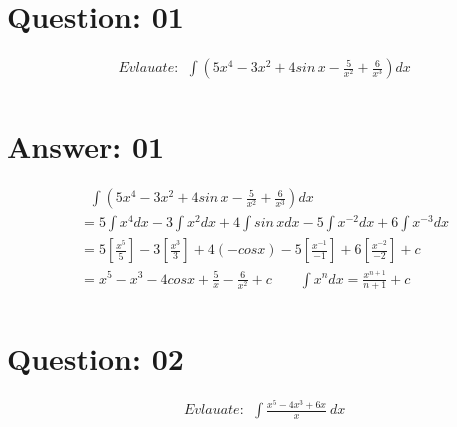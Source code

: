 \documentclass[17pt]{extarticle}
\begin{document}
\noindent

\begin{fleqn} 


\section{Question: 01}

\begin{equation} \nonumber
\begin{alignedat}{4}
& Evlauate :\ \  \int \left( 5x^4-3x^2+4sin\,x - \frac{5}{x^2}+\frac{6}{x^3}\right) dx\\
\end{alignedat}
\end{equation}


\section{Answer: 01}

\begin{equation} \nonumber
\begin{alignedat}{4}
& \texttt{\ \ } \int \left( 5x^4-3x^2+4sin\,x - \frac{5}{x^2}+\frac{6}{x^3}\right) dx\\
&= 5\int x^4dx-3\int x^2dx+4\int sin\,xdx - 5\int {x^{-2}}dx+6\int x^{-3}dx\\
&= 5\left[\frac{x^5}{5}\right]-3\left[\frac{x^3}{3}\right]+4(-cos x)-5\left[\frac{x^{-1}}{-1} \right]+6\left[\frac{x^{-2}}{-2} \right]+c\\
&= x^5 - x^3 - 4cosx + \frac{5}{x} - \frac{6}{x^2}+c \quad \boxed{\quad\int x^ndx = \frac{x^{n+1}}{n+1}+c\ }\\
\end{alignedat}
\end{equation}


\section{Question: 02}

\begin{equation} \nonumber
\begin{alignedat}{4}
& Evlauate :\ \  \int \frac{x^5 - 4x^3 + 6x}{x}\ dx\\
\end{alignedat}
\end{equation}



\end{fleqn}
\end{document}
